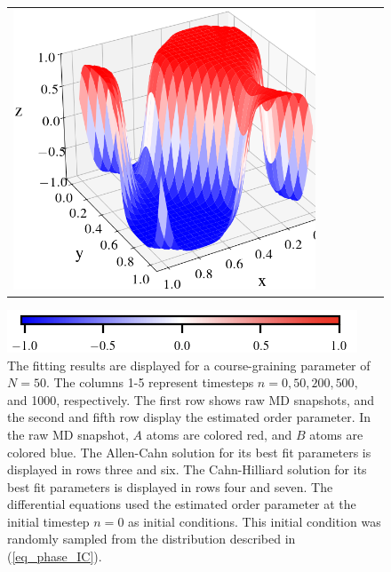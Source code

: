 \documentclass[12pt, reqno]{report}
\theoremstyle{definition}
\theoremstyle{remark}
\begin{document}
\begin{figure}[H]
\begin{tabular}{rccccc}
        \includegraphics[align = c, height=\subheight]{media_paper/end_CH_surf_FD_n=1000.png}
    \end{tabular}

    \hspace{100pt}\includegraphics[width = .55\paperwidth]{media_paper/phase_colorbar.png}
    \caption{
        The fitting results are displayed for a course-graining parameter of $N=50$.
        The columns 1-5 represent timesteps $n=0,50,200,500,$ and 1000, respectively.
        The first row shows raw MD snapshots, and the second and fifth row display the estimated order parameter.
        In the raw MD snapshot, $A$ atoms are colored red, and $B$ atoms are colored blue.
        The Allen-Cahn solution for its best fit parameters is displayed in rows three and six.
        The Cahn-Hilliard solution for its best fit parameters is displayed in rows four and seven.
        The differential equations used the estimated order parameter at the initial timestep $n=0$ as initial conditions. 
        This initial condition was randomly sampled from the distribution described in (\ref{eq_phase_IC}).
    }
    \label{fg_phase_results}
\end{figure}






\nocite{*}
\printbibliography
\end{document}
